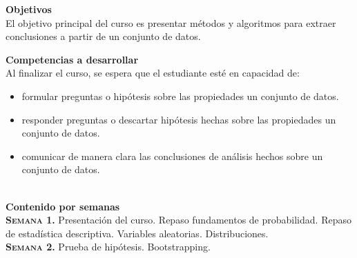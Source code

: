 \documentclass[letterpaper,10pt,onecolumn]{article}
\begin{document}
\noindent\textbf{\large {} \quad Objetivos}\\[-0.2cm]

\noindent\normalsize El objetivo principal del curso es presentar métodos y algoritmos
para extraer conclusiones a partir de un conjunto de datos.
\vspace*{0.5cm} 

\noindent\textbf{\large {} \quad Competencias a
  desarrollar}\\[-0.2cm] 


\noindent\normalsize Al finalizar el curso, se espera que el
estudiante est\'e en capacidad de: 

\begin{itemize}
\item formular preguntas o hipótesis sobre las propiedades un conjunto de datos. \\[-0.6cm]   
\item  responder preguntas o descartar hipótesis hechas sobre las propiedades un conjunto de datos.\\[-0.6cm]  
\item  comunicar de manera clara las conclusiones de análisis hechos sobre un conjunto de datos.\\[-0.6cm]  
\\[-0.6cm]  
\end{itemize}

\vspace*{0.5cm} 

\noindent\textbf{\large {} \quad Contenido por
  semanas}\\[-0.2cm]  


\noindent\textbf{\textsc{Semana 1.}} 
Presentaci\'on del curso. 
Repaso fundamentos de probabilidad. Repaso de estadística descriptiva. Variables aleatorias. Distribuciones.
\\[-0.3cm] %


\noindent\textbf{\textsc{Semana 2.}}
Prueba de hipótesis. Bootstrapping. 
\\[-0.3cm]
\end{document}
